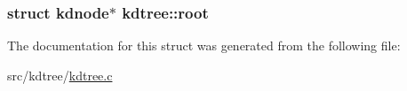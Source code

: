 \subsubsection[{root}]{\setlength{\rightskip}{0pt plus 5cm}struct {\bf kdnode}$\ast$ kdtree\+::root}\label{structkdtree_accef3227abac75a5eed239590ce574d9}


The documentation for this struct was generated from the following file\+:\begin{DoxyCompactItemize}
\item 
src/kdtree/\hyperlink{kdtree_8c}{kdtree.\+c}\end{DoxyCompactItemize}
